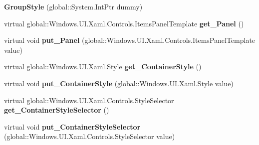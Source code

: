 \begin{DoxyCompactItemize}
\item 
\mbox{\label{class_windows_1_1_u_i_1_1_xaml_1_1_controls_1_1_group_style_a48ddd6c81df5d4b20a17360153322649}} 
{\bfseries Group\+Style} (global\+::\+System.\+Int\+Ptr dummy)
\item 
\mbox{\label{class_windows_1_1_u_i_1_1_xaml_1_1_controls_1_1_group_style_a3c268ef18089368deaadd594eb77b93f}} 
virtual global\+::\+Windows.\+U\+I.\+Xaml.\+Controls.\+Items\+Panel\+Template {\bfseries get\+\_\+\+Panel} ()
\item 
\mbox{\label{class_windows_1_1_u_i_1_1_xaml_1_1_controls_1_1_group_style_abdff045e22bd9e3c822ebdbb721ca0cd}} 
virtual void {\bfseries put\+\_\+\+Panel} (global\+::\+Windows.\+U\+I.\+Xaml.\+Controls.\+Items\+Panel\+Template value)
\item 
\mbox{\label{class_windows_1_1_u_i_1_1_xaml_1_1_controls_1_1_group_style_aca3b627e4f154a3c71dfb861be9a9d70}} 
virtual global\+::\+Windows.\+U\+I.\+Xaml.\+Style {\bfseries get\+\_\+\+Container\+Style} ()
\item 
\mbox{\label{class_windows_1_1_u_i_1_1_xaml_1_1_controls_1_1_group_style_abb8477a846bdaf75ee930b67c2f7d88d}} 
virtual void {\bfseries put\+\_\+\+Container\+Style} (global\+::\+Windows.\+U\+I.\+Xaml.\+Style value)
\item 
\mbox{\label{class_windows_1_1_u_i_1_1_xaml_1_1_controls_1_1_group_style_a2de61fd35bfccb41a006bc9635ed88ec}} 
virtual global\+::\+Windows.\+U\+I.\+Xaml.\+Controls.\+Style\+Selector {\bfseries get\+\_\+\+Container\+Style\+Selector} ()
\item 
\mbox{\label{class_windows_1_1_u_i_1_1_xaml_1_1_controls_1_1_group_style_a87a315fbb444d0a30f115de2f3729cc7}} 
virtual void {\bfseries put\+\_\+\+Container\+Style\+Selector} (global\+::\+Windows.\+U\+I.\+Xaml.\+Controls.\+Style\+Selector value)
\item 

\end{DoxyCompactItemize}
